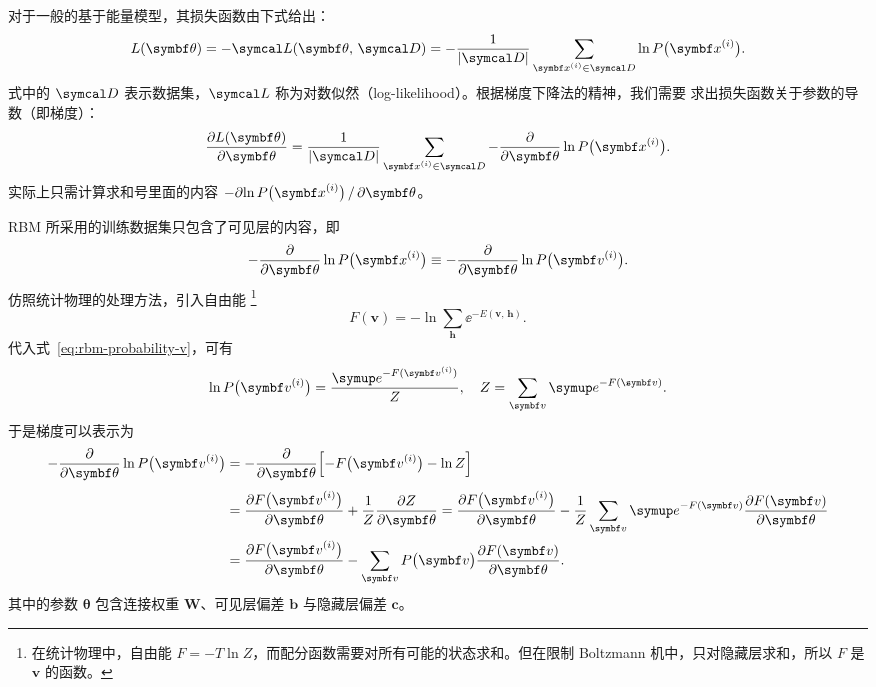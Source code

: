 对于一般的基于能量模型，其损失函数由下式给出：
\begin{equation}
  \label{eq:ebm-loss-function}
  L(\bm{\theta})
  = - \likeL(\bm{\theta},\,\domD)
  = - \frac{1}{\abs{\domD}} \sum_{\bm{x}^{(i)}\in\domD} \ln P\qty\big(\bm{x}^{(i)}).
\end{equation}
式中的 $\domD$ 表示数据集，$\likeL$ 称为对数似然（log-likelihood）。根据梯度下降法的精神，我们需要
求出损失函数关于参数的导数（即梯度）：
\begin{equation}
  \pdv{L(\bm{\theta})}{\bm{\theta}}
  = \frac{1}{\abs{\domD}} \sum_{\bm{x}^{(i)}\in\domD}
    - \pdv{\bm{\theta}} \ln P\qty\big(\bm{x}^{(i)}).
\end{equation}
实际上只需计算求和号里面的内容 $-\partial{\ln P\qty\big(\bm{x}^{(i)})}\,/\,\partial{\bm{\theta}}$。

RBM 所采用的训练数据集只包含了可见层的内容，即
\begin{equation}
  - \pdv{\bm{\theta}} \ln P\qty\big(\bm{x}^{(i)}) \equiv
  - \pdv{\bm{\theta}} \ln P\qty\big(\bm{v}^{(i)}).
\end{equation}
仿照统计物理的处理方法，引入自由能
\footnote{在统计物理中，自由能 $F=-T\ln Z$，而配分函数需要对所有可能的状态求和。但在限制
  Boltzmann 机中，只对隐藏层求和，所以 $F$ 是 $\bm{v}$ 的函数。}
\begin{equation}
  F(\bm{v}) = - \ln \sum_{\bm{h}} \ee^{-E(\bm{v},\,\bm{h})}.
\end{equation}
代入式~\eqref{eq:rbm-probability-v}，可有
\begin{equation}
  \ln P\qty\big(\bm{v}^{(i)}) = \frac{\ee^{-F(\bm{v}^{(i)})}}{Z} \qc
  Z = \sum_{\bm{v}} \ee^{-F(\bm{v})}.
\end{equation}
于是梯度可以表示为
\begin{align}
  \label{eq:rmb-gradient}
     - \pdv{\bm{\theta}} \ln P\qty\big(\bm{v}^{(i)})
  &= - \pdv{\bm{\theta}} \qty\Big[-F\qty\big(\bm{v}^{(i)}) - \ln Z]
     \vphantom{\sum_x} \notag \\
  &= \pdv{F\qty\big(\bm{v}^{(i)})}{\bm{\theta}} + \frac{1}{Z} \pdv{Z}{\bm{\theta}}
   = \pdv{F\qty\big(\bm{v}^{(i)})}{\bm{\theta}}
     - \frac{1}{Z} \sum_{\bm{v}} \ee^{-F(\bm{v})} \pdv{F(\bm{v})}{\bm{\theta}} \notag \\
  &= \pdv{F\qty\big(\bm{v}^{(i)})}{\bm{\theta}}
     - \sum_{\bm{v}} P\qty\big(\bm{v}) \pdv{F(\bm{v})}{\bm{\theta}}.
\end{align}
其中的参数 $\bm{\theta}$ 包含连接权重 $\bm{W}$、可见层偏差 $\bm{b}$ 与隐藏层偏差 $\bm{c}$。


